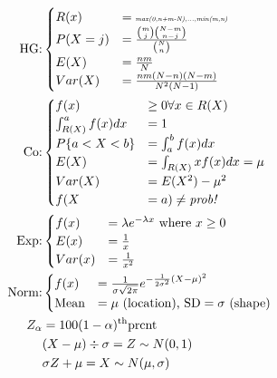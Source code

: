 \documentclass{article}
\newcommand{\note}[1]{\tiny\smash{\textit{#1}}}
\begin{document}
\begin{minipage}{0.48\textwidth}
	\begin{align*}
		\text{HG:} &
		\begin{cases}
			R(x) &= \note{max(0,n+m-N),...,min(m,n)} \\
			P(X=j) &= \frac{\binom{m}{j} \binom{N-m}{n-j}}{\binom{N}{n}} \\
			E(X) &= \frac{nm}{N} \\
			Var(X) &= \frac{nm(N-n)(N-m)}{N^2(N-1)}
		\end{cases} \\
		\text{Co:} &
		\begin{cases}
			f(x) &\ge 0 \forall x \in R(X) \\
			\int_{R(X)}^a f(x) dx &= 1 \\
			P\{ a < X < b \} &= \int_a^b f(x) dx \\
			E(X) &= \int_{R(X)} x f(x) dx = \mu \\
			Var(X) &= E(X^2) - \mu^2 \\
			f(X &= a) \ne \textit{prob!}
		\end{cases} \\
		\text{Exp:} &
		\begin{cases}
			f(x) &= \lambda e^{- \lambda x} \text{ where } x \ge 0 \\
			E(x) &= \frac{1}{x} \\
			Var(x) &= \frac{1}{x^2} \\
		\end{cases} \\
		\text{Norm:} &
		\begin{cases}
			f(x) &= \frac{1}{ \sigma \sqrt{2 \pi} } e^{ - \frac{1}{2\sigma^2}(X-\mu)^2} \\
			\text{Mean} &= \mu \text{ (location)} \text{, SD} = \sigma \text{ (shape)} \\
		\end{cases} \\
		Z_\alpha &= 100(1-\alpha)^\text{th} \text{prcnt} \\
		& (X - \mu) \div \sigma = Z \sim N(0,1) \\
		& \sigma Z + \mu = X \sim N(\mu,\sigma)
	\end{align*}
\end{minipage}
\end{document}
